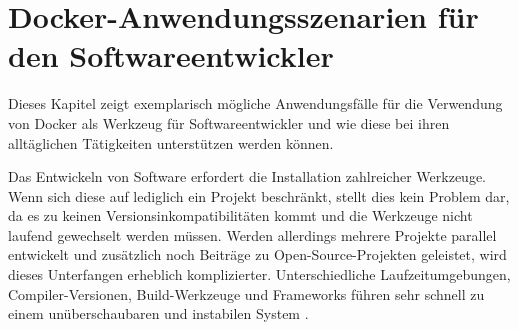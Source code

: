 \chapter{Docker-Anwendungsszenarien für den Softwareentwickler}
\label{cha:szenarien}
Dieses Kapitel zeigt exemplarisch mögliche Anwendungsfälle für die Verwendung von Docker als Werkzeug für Softwareentwickler und wie diese bei ihren alltäglichen Tätigkeiten unterstützen werden können.

Das Entwickeln von Software erfordert die Installation zahlreicher Werkzeuge.
Wenn sich diese auf lediglich ein Projekt beschränkt, stellt dies kein Problem dar, da es zu keinen Versionsinkompatibilitäten kommt und die Werkzeuge nicht laufend gewechselt werden müssen.
Werden allerdings mehrere Projekte parallel entwickelt und zusätzlich noch Beiträge zu Open-Source-Projekten geleistet, wird dieses Unterfangen erheblich komplizierter.
Unterschiedliche Laufzeitumgebungen, Compiler-Versionen, Build-Werkzeuge und Frameworks führen sehr schnell zu einem unüberschaubaren und instabilen System \autocite{smashing-local-devenv-docker:online}.

